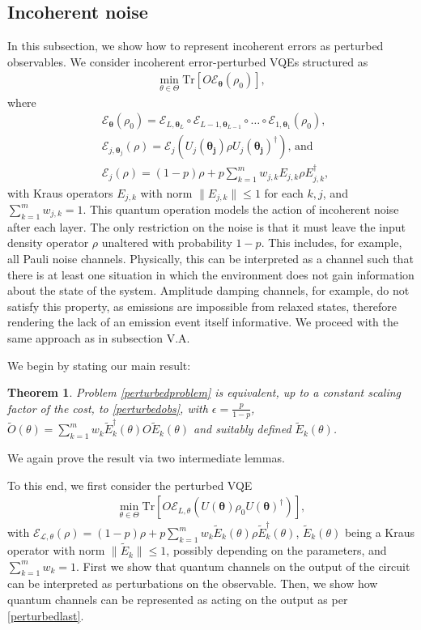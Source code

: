 \documentclass[letterpaper, 10 pt]{IEEEtran}  %
\newcommand{\Tr}{\mathrm{Tr}}
\newtheorem{theorem}{Theorem}
\begin{document}
\subsection{Incoherent noise}
In this subsection, we show how to represent incoherent errors as perturbed observables. 
We consider incoherent error-perturbed VQEs structured as
\begin{align}
    \min_{\theta \in \Theta} \Tr[O \mathcal{E}_\mathbf{\theta}(\rho_0)], \label{perturbedproblem}
\end{align} 
where 
\begin{align}
   &\mathcal{E}_\mathbf{\theta}(\rho_0)=\mathcal{E}_{L,\mathbf{\theta}_L} \circ \mathcal{E}_{L-1,\mathbf{\theta}_{L-1}} \circ \dots \circ \mathcal{E}_{1,\mathbf{\theta}_1} (\rho_0)\text{,} \\
   &\mathcal{E}_{j,\mathbf{\theta}_j}(\rho)=\mathcal{E}_j (U_j(\mathbf{\theta_j}) \rho U_j(\mathbf{\theta_j})^\dagger)\text{, and } \\
   &\mathcal{E}_j(\rho)=(1-p)\rho + p \sum_{k=1}^{m} w_{j,k} E_{j,k} \rho E_{j,k}^\dagger,
\end{align}
with Kraus operators $E_{j,k}$ with norm $\|E_{j,k}\| \le 1$ for each $k,j$, and $\sum_{k=1}^{m} w_{j,k}=1$.
This quantum operation models the action of incoherent noise after each layer. The only restriction on the noise is that it must leave the input density operator $\rho$ unaltered with probability $1-p$.
This includes, for example, all Pauli noise channels. Physically, this can be interpreted as a channel such that there is at least one situation in which the environment does not gain information about the state of the system. 
Amplitude damping channels, for example, do not satisfy this property, as emissions are impossible from relaxed states, therefore rendering the lack of an emission event itself informative. 
We proceed with the same approach as in subsection V.A. 

We begin by stating our main result: 
\begin{theorem}
   Problem \eqref{perturbedproblem} is equivalent, up to a constant scaling factor of the cost, to \eqref{perturbedobs}, with $\epsilon=\frac{p}{1-p}$,
   $\tilde{O}(\theta)=\sum_{k=1}^{m} w_{k} \tilde E_{k}^\dagger(\theta) O \tilde E_{k}(\theta)$ and suitably defined $\tilde{E}_k(\theta)$.
\end{theorem}

We again prove the result via two intermediate lemmas.

To this end, we first consider the perturbed VQE 
\begin{align}
   \min_{\theta \in \Theta} \Tr[O \mathcal{E}_{L,\theta}(U(\mathbf{\theta}) \rho_0 U(\mathbf{\theta})^\dagger)], \label{perturbedlast}
\end{align}
with $\mathcal{E_{L,\theta}(\rho)}=(1-p)\rho + p \sum_{k=1}^{m} w_k \tilde E_k(\theta) \rho \tilde E_k^\dagger(\theta)$, $\tilde E_k(\theta)$ being a Kraus operator with norm $\|\tilde E_k\| \le 1$, possibly depending on the parameters, and $\sum_{k=1}^{m} w_k=1$.
First we show that quantum channels on the output of the circuit can be interpreted as perturbations on the observable. 
Then, we show how quantum channels can be represented as acting on the output as per \eqref{perturbedlast}.
\end{document}
